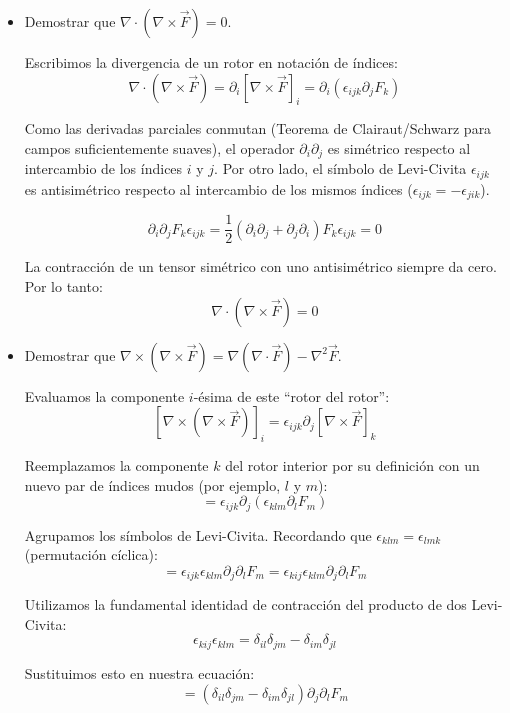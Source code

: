 \documentclass[11pt,spanish]{article}
\begin{document}
\begin{itemize}
Por lo tanto:
$$[\nabla \times (\phi\vec{F})]_i = [(\nabla\phi) \times \vec{F}]_i + \phi [\nabla \times \vec{F}]_i$$
Lo que demuestra la identidad vectorial.

\item[c)] Demostrar que $\nabla \cdot (\nabla \times \vec{F}) = 0$.

Escribimos la divergencia de un rotor en notación de índices:
$$\nabla \cdot (\nabla \times \vec{F}) = \partial_i [\nabla \times \vec{F}]_i = \partial_i (\epsilon_{ijk} \partial_j F_k)$$

Como las derivadas parciales conmutan (Teorema de Clairaut/Schwarz para campos suficientemente suaves), el operador $\partial_i \partial_j$ es simétrico respecto al intercambio de los índices $i$ y $j$.
Por otro lado, el símbolo de Levi-Civita $\epsilon_{ijk}$ es antisimétrico respecto al intercambio de los mismos índices ($\epsilon_{ijk} = -\epsilon_{jik}$).

$$\partial_i \partial_j F_k \epsilon_{ijk} = \frac{1}{2} (\partial_i \partial_j + \partial_j \partial_i) F_k \epsilon_{ijk} = 0$$

La contracción de un tensor simétrico con uno antisimétrico siempre da cero. Por lo tanto:
$$\nabla \cdot (\nabla \times \vec{F}) = 0$$

\item[d)] Demostrar que $\nabla \times (\nabla \times \vec{F}) = \nabla(\nabla \cdot \vec{F}) - \nabla^2 \vec{F}$.

Evaluamos la componente $i$-ésima de este ``rotor del rotor'':
$$[\nabla \times (\nabla \times \vec{F})]_i = \epsilon_{ijk} \partial_j [\nabla \times \vec{F}]_k$$

Reemplazamos la componente $k$ del rotor interior por su definición con un nuevo par de índices mudos (por ejemplo, $l$ y $m$):
$$= \epsilon_{ijk} \partial_j (\epsilon_{klm} \partial_l F_m)$$

Agrupamos los símbolos de Levi-Civita. Recordando que $\epsilon_{klm} = \epsilon_{lmk}$ (permutación cíclica):
$$= \epsilon_{ijk} \epsilon_{klm} \partial_j \partial_l F_m = \epsilon_{kij} \epsilon_{klm} \partial_j \partial_l F_m$$

Utilizamos la fundamental identidad de contracción del producto de dos Levi-Civita:
$$\epsilon_{kij} \epsilon_{klm} = \delta_{il} \delta_{jm} - \delta_{im} \delta_{jl}$$

Sustituimos esto en nuestra ecuación:
$$= (\delta_{il} \delta_{jm} - \delta_{im} \delta_{jl}) \partial_j \partial_l F_m$$


\end{itemize}
\end{document}
